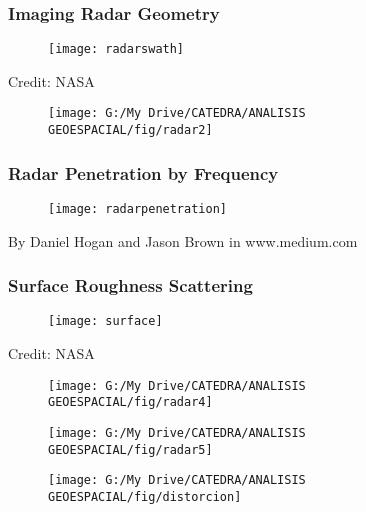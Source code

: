 \documentclass[14pt]{beamer}
\begin{document}
\begin{frame}
\frametitle{Imaging Radar Geometry}
 \begin{figure}
    \centering
    \texttt{[image: radarswath]}
  \end{figure}
\tiny{Credit: NASA}
\end{frame}
\begin{frame}
 \begin{figure}
    \centering
    \texttt{[image: G:/My Drive/CATEDRA/ANALISIS GEOESPACIAL/fig/radar2]}
  \end{figure}
\end{frame}
\begin{frame}
\frametitle{Radar Penetration by Frequency}
 \begin{figure}
    \centering
    \texttt{[image: radarpenetration]}
  \end{figure}
\tiny{By Daniel Hogan and Jason Brown in www.medium.com}
\end{frame}
\begin{frame}
\frametitle{Surface Roughness Scattering}
 \begin{figure}
    \centering
    \texttt{[image: surface]}
  \end{figure}
\tiny{Credit: NASA}
\end{frame}
\begin{frame}
 \begin{figure}
    \centering
    \texttt{[image: G:/My Drive/CATEDRA/ANALISIS GEOESPACIAL/fig/radar4]}
  \end{figure}
\end{frame}
\begin{frame}
 \begin{figure}
    \centering
    \texttt{[image: G:/My Drive/CATEDRA/ANALISIS GEOESPACIAL/fig/radar5]}
  \end{figure}
\end{frame}
\begin{frame}
 \begin{figure}
    \centering
    \texttt{[image: G:/My Drive/CATEDRA/ANALISIS GEOESPACIAL/fig/distorcion]}
  \end{figure}
\end{frame}
\end{document}
